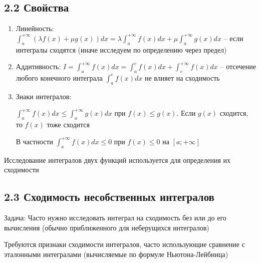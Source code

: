 \documentclass[12pt]{article}
\begin{document}
    \subsection{2.2 Свойства}
    \hypertarget{improperintegralproperties}{}

    \begin{enumerate}
        \item Линейность: $\displaystyle \int^{+\infty}_{a} (\lambda f(x) + \mu g(x)) dx = \lambda \int^{+\infty}_{a} f(x) dx + \mu \int^{+\infty}_{a} g(x) dx$
        -- если интегралы сходятся (иначе исследуем по определению через предел)

        \item Аддитивность: $\displaystyle I = \int^{+\infty}_{a} f(x) dx = \int^{c}_{a} f(x) dx + \int^{+\infty}_{c} f(x) dx$
        -- отсечение любого конечного интеграла $\int^{c}_{a} f(x) dx$ не влияет на сходимость

        \item Знаки интегралов:

        $\displaystyle \int^{+\infty}_{a} f(x) dx \leq \int^{+\infty}_{a} g(x) dx $ при $f(x) \leq g(x)$. Если $g(x)$ сходится, то $f(x)$ тоже сходится

        В частности $\displaystyle \int^{+\infty}_{a} f(x) dx \leq 0$ при $f(x) \leq 0$ на $[a; +\infty]$
    \end{enumerate}

    \Nota Исследование интегралов двух функций используется для определения их сходимости


    \subsection{2.3 Сходимость несобственных интегралов}
    \hypertarget{improperintegralconvergence}{}

    Задача: Часто нужно исследовать интеграл на сходимость без или до его вычисления (обычно приближенного для неберущихся интегралов)

    Требуются признаки сходимости интегралов, часто использующие сравнение с эталонными интегралами (вычисляемые по формуле Ньютона-Лейбница)
\end{document}
